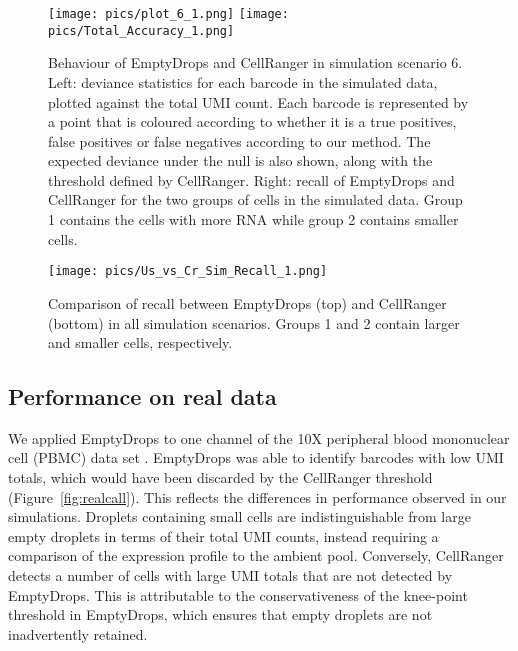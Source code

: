 \documentclass[10pt,letterpaper]{article}
\begin{document}
\begin{figure}[bt]
\begin{center}
    \texttt{[image: pics/plot\_6\_1.png]}
    \texttt{[image: pics/Total\_Accuracy\_1.png]}
\end{center}
\caption{Behaviour of EmptyDrops and CellRanger in simulation scenario 6.
    Left: deviance statistics for each barcode in the simulated data, plotted against the total UMI count.
    Each barcode is represented by a point that is coloured according to whether it is a true positives, false positives or false negatives according to our method.
    The expected deviance under the null is also shown, along with the threshold defined by CellRanger.
    Right: recall of EmptyDrops and CellRanger for the two groups of cells in the simulated data.
    Group 1 contains the cells with more RNA while group 2 contains smaller cells.
}
\label{fig:simdemo}
\end{figure}

\begin{figure}[bt]
    \begin{center}
        \texttt{[image: pics/Us\_vs\_Cr\_Sim\_Recall\_1.png]}
    \end{center}
    \caption{Comparison of recall between EmptyDrops (top) and CellRanger (bottom) in all simulation scenarios.
    Groups 1 and 2 contain larger and smaller cells, respectively.}
    \label{fig:simall}
\end{figure}

\subsection*{Performance on real data}
We applied EmptyDrops to one channel of the 10X peripheral blood mononuclear cell (PBMC) data set \cite{zheng2017massively}.
EmptyDrops was able to identify barcodes with low UMI totals, which would have been discarded by the CellRanger threshold (Figure~\ref{fig:realcall}). 
This reflects the differences in performance observed in our simulations.
Droplets containing small cells are indistinguishable from large empty droplets in terms of their total UMI counts, instead requiring a comparison of the expression profile to the ambient pool.
Conversely, CellRanger detects a number of cells with large UMI totals that are not detected by EmptyDrops.
This is attributable to the conservativeness of the knee-point threshold in EmptyDrops, which ensures that empty droplets are not inadvertently retained.
\end{document}

